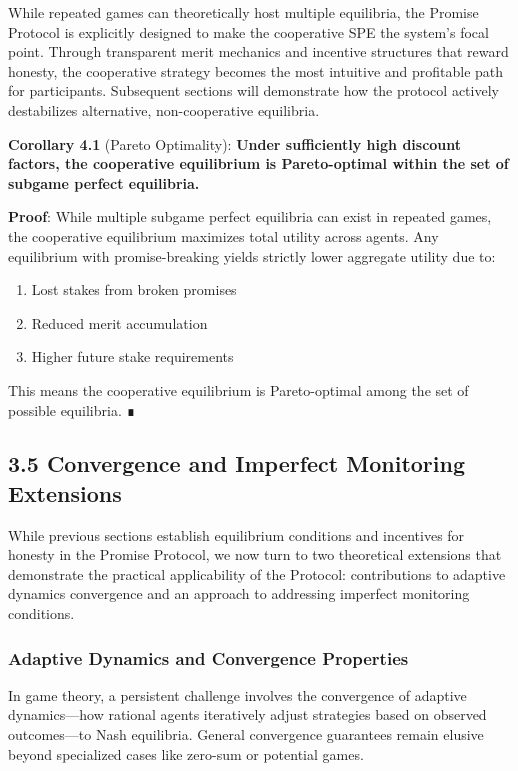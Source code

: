 \documentclass[11pt]{article}
\begin{document}
While repeated games can theoretically host multiple equilibria, the Promise Protocol is explicitly designed to make the cooperative SPE the system's focal point. Through transparent merit mechanics and incentive structures that reward honesty, the cooperative strategy becomes the most intuitive and profitable path for participants. Subsequent sections will demonstrate how the protocol actively destabilizes alternative, non-cooperative equilibria.

\textbf{Corollary 4.1} (Pareto Optimality): \textbf{Under sufficiently high discount factors, the cooperative equilibrium is Pareto-optimal within the set of subgame perfect equilibria.}

\textbf{Proof}:
While multiple subgame perfect equilibria can exist in repeated games, the cooperative equilibrium maximizes total utility across agents. Any equilibrium with promise-breaking yields strictly lower aggregate utility due to:
\begin{enumerate}
\item Lost stakes from broken promises
\item Reduced merit accumulation
\item Higher future stake requirements
\end{enumerate}

This means the cooperative equilibrium is Pareto-optimal among the set of possible equilibria. ∎
\subsection{3.5 Convergence and Imperfect Monitoring Extensions}
\label{sec:org12697b8}

While previous sections establish equilibrium conditions and incentives for honesty in the Promise Protocol, we now turn to two theoretical extensions that demonstrate the practical applicability of the Protocol: contributions to adaptive dynamics convergence and an approach to addressing imperfect monitoring conditions.
\subsubsection{Adaptive Dynamics and Convergence Properties}
\label{sec:orgf8cae84}

In game theory, a persistent challenge involves the convergence of adaptive dynamics—how rational agents iteratively adjust strategies based on observed outcomes—to Nash equilibria. General convergence guarantees remain elusive beyond specialized cases like zero-sum or potential games.
\end{document}
